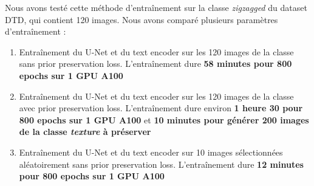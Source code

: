 \documentclass{article}
\begin{document}
Nous avons testé cette méthode d'entraînement sur la classe \textit{zigzagged} du dataset DTD, qui contient 120 images. Nous avons comparé plusieurs paramètres d'entraînement :
\begin{enumerate}
    \item Entraînement du U-Net et du text encoder sur les 120 images de la classe sans prior preservation loss. L'entraînement dure \textbf{58 minutes pour 800 epochs sur 1 GPU A100}
    \item Entraînement du U-Net et du text encoder sur les 120 images de la classe avec prior preservation loss. L'entraînement dure environ \textbf{1 heure 30 pour 800 epochs sur 1 GPU A100} et \textbf{10 minutes pour générer 200 images de la classe \textit{texture} à préserver}
    \item Entraînement du U-Net et du text encoder sur 10 images sélectionnées aléatoirement sans prior preservation loss. L'entraînement dure \textbf{12 minutes pour 800 epochs sur 1 GPU A100}
\end{enumerate}
\end{document}
